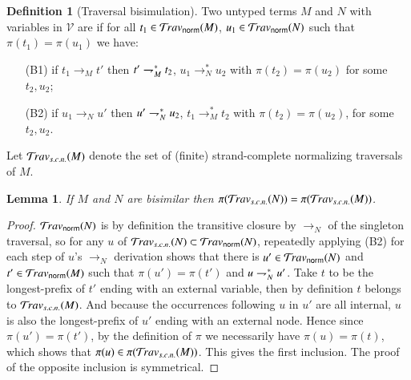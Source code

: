 \documentclass{elsarticle}
\theoremstyle{plain}
\newtheorem{lemma}[theorem]{Lemma}
\theoremstyle{definition}
\newtheorem{definition}{Definition}[section]
\newcommand{\normalizing}{{\sf norm}}
\newcommand{\travsetnorm}{\travset_\normalizing} %
\newcommand{\travsetscn}{\travset_{s.c.n.}} %
\def\coresymbol{\pi} %
\newcommand{\core}[1]{\coresymbol(#1)} %
\begin{document}
\begin{definition}[Traversal bisimulation]
\label{def:bisimilar_terms}
Two untyped terms $M$ and $N$ with variables in $\mathcal{V}$
 are  if
for all $t_1 \in \travsetnorm(M)$, $u_1 \in \travsetnorm(N)$ such that
$\core{t_1} = \core{u_1}$ we have:
\begin{itemize}[nosep]
    \item[(B1)]
    if $t_1 \rightarrow_M t'$ then
        $t' \rightharpoondown_M^* t_2$,
        $u_1 \rightarrow^*_N u_2$
        with $\core{t_2} = \core{u_2}$
        for some $t_2, u_2$;
    \item[(B2)]
    if $u_1 \rightarrow_N u'$ then
      $u' \rightharpoondown_N^* u_2$,
      $t_1 \rightarrow^*_M t_2$
      with $\core{t_2} = \core{u_2}$,
       for some $t_2,u_2$.
\end{itemize}
\end{definition}


Let $\travsetscn(M)$ denote the set of (finite) strand-complete normalizing traversals of $M$.

\begin{lemma}
\label{lem:bisimulation_isomorphism}
If $M$ and $N$ are bisimilar
then $\coresymbol(\travsetscn(N)) = \coresymbol(\travsetscn(M))$.
\end{lemma}
\begin{proof}
$\travsetnorm(N)$ is by definition the transitive closure by $\rightarrow_N$ of the singleton traversal,
so for any $u$ of $\travsetscn(N) \subset \travsetnorm(N)$, repeatedly applying (B2) for each step of $u$'s $\rightarrow_N$ derivation shows that there is $u' \in \travsetnorm(N)$ and  $t' \in \travsetnorm(M)$
such that $\core{u'} = \core{t'}$
and $u \rightharpoondown_N^* u'$.
Take $t$ to be the longest-prefix of $t'$ ending with an external variable, then by definition $t$ belongs to $\travsetscn(M)$.
And because the occurrences following $u$ in $u'$ are all internal, $u$ is also the longest-prefix of $u'$ ending with an external node.
Hence since $\core{u'} = \core{t'}$, by the definition of
$\coresymbol$ we necessarily have $\core{u} = \core{t}$, which shows that
$\core{u}\in \core{\travsetscn(M)}$.
This gives the first inclusion.
The proof of the opposite inclusion is symmetrical.
\end{proof}
\end{document}
